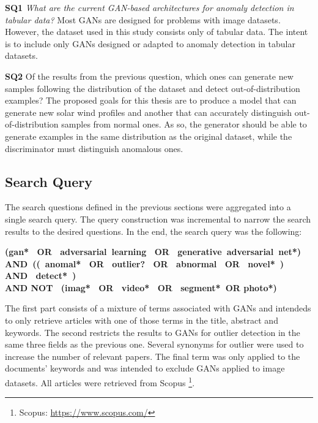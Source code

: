 \noindent\textbf{SQ1} \textit{What are the current GAN-based architectures for anomaly detection in tabular data?} Most GANs are designed for problems with image datasets. However, the dataset used in this study consists only of tabular data. The intent is to include only GANs designed or adapted to anomaly detection in tabular datasets.

\noindent\textbf{SQ2} Of the results from the previous question, which ones can generate new samples following the distribution of the dataset and detect out-of-distribution examples? The proposed goals for this thesis are to produce a model that can generate new solar wind profiles and another that can accurately distinguish out-of-distribution samples from normal ones. As so, the generator should be able to generate examples in the same distribution as the original dataset, while the discriminator must distinguish anomalous ones.

\subsection{Search Query}\label{sec:gan_search_queries}
The search questions defined in the previous sections were aggregated into a single search query. The query construction was incremental to narrow the search results to the desired questions. In the end, the search query was the following:
\begin{center}
\textbf{(gan*  OR  adversarial learning  OR  generative adversarial net*) \\ AND (( anomal*  OR  outlier?  OR  abnormal  OR  novel* )  AND  detect* ) \\ AND NOT  (imag*  OR  video*  OR  segment* OR photo*)}
\end{center}

The first part consists of a mixture of terms associated with GANs and intendeds to only retrieve articles with one of those terms in the title, abstract and keywords. The second restricts the results to GANs for outlier detection in the same three fields as the previous one. Several synonyms for outlier were used to increase the number of relevant papers. The final term was only applied to the documents' keywords and was intended to exclude GANs applied to image datasets. All articles were retrieved from Scopus \footnote{Scopus: \url{https://www.scopus.com/}}.


